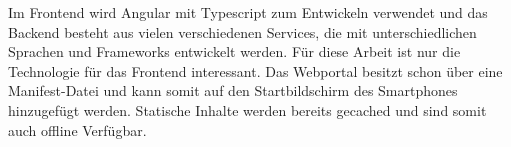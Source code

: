

Im Frontend wird Angular mit Typescript zum Entwickeln verwendet und das Backend besteht aus vielen verschiedenen Services, die mit unterschiedlichen Sprachen und Frameworks entwickelt werden. Für diese Arbeit ist nur die Technologie für das Frontend interessant. Das Webportal besitzt schon über eine Manifest-Datei und kann somit auf den Startbildschirm des Smartphones hinzugefügt werden. Statische Inhalte werden bereits gecached und sind somit auch offline Verfügbar. 
